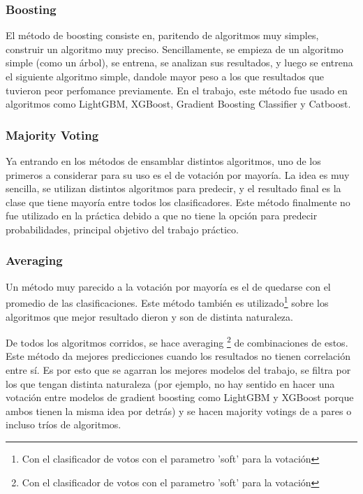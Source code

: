 \documentclass[a4paper]{article}
\begin{document}
\subsubsection{Boosting}

El método de boosting consiste en, paritendo de algoritmos muy simples, construir un algoritmo muy preciso. Sencillamente, se empieza de un algoritmo simple (como un árbol), se entrena, se analizan sus resultados, y luego se entrena el siguiente algoritmo simple, dandole mayor peso a los que resultados que tuvieron peor perfomance previamente. En el trabajo, este método fue usado en algoritmos como LightGBM, XGBoost, Gradient Boosting Classifier y Catboost.

\subsubsection{Majority Voting}

Ya entrando en los métodos de ensamblar distintos algoritmos, uno de los primeros a considerar para su uso es el de votación por mayoría. La idea es muy sencilla, se utilizan distintos algoritmos para predecir, y el resultado final es la clase que tiene mayoría entre todos los clasificadores. Este método finalmente no fue utilizado en la práctica debido a que no tiene la opción para predecir probabilidades, principal objetivo del trabajo práctico.

\subsubsection{Averaging}

Un método muy parecido a la votación por mayoría es el de quedarse con el promedio de las clasificaciones. Este método también es utilizado\footnote{Con el clasificador de votos con el parametro 'soft' para la votación} sobre los algoritmos que mejor resultado dieron y son de distinta naturaleza. 

De todos los algoritmos corridos, se hace averaging \footnote{Con el clasificador de votos con el parametro 'soft' para la votación} de combinaciones de estos. Este método da mejores predicciones cuando los resultados no tienen correlación entre sí. Es por esto que se agarran los mejores modelos del trabajo, se filtra por los que tengan distinta naturaleza (por ejemplo, no hay sentido en hacer una votación entre modelos de gradient boosting como LightGBM y XGBoost porque ambos tienen la misma idea por detrás) y se hacen majority votings de a pares o incluso tríos de algoritmos.
\end{document}
